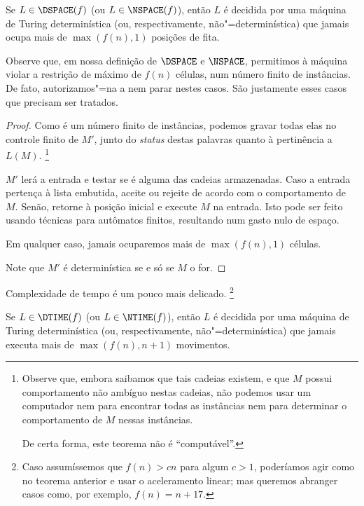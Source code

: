 \begin{theorem}
    Se $L \in \DSPACE(f)$ (ou $L \in \NSPACE(f)$),
    então $L$ é decidida por uma máquina de Turing
    determinística (ou, respectivamente, não"=determinística)
    que jamais ocupa mais de $\max(f(n), 1)$
    posições de fita.
\end{theorem}

Observe que, em nossa definição de $\DSPACE$ e $\NSPACE$,
permitimos à máquina violar a restrição de
máximo de $f(n)$ células,
num número finito de instâncias.
De fato,
autorizamos"=na a nem parar nestes casos.
São justamente esses casos que precisam ser tratados.

\begin{proof}
    Como é um número finito de instâncias,
    podemos gravar todas elas no controle finito de $M'$,
    junto do \emph{status} destas palavras
    quanto à pertinência a $L(M)$.
    \footnote{
        Observe que,
        embora saibamos que tais cadeias existem,
        e que $M$ possui comportamento não ambíguo
        nestas cadeias,
        não podemos usar um computador
        nem para encontrar todas as instâncias
        nem para determinar o comportamento de $M$ nessas instâncias.

        De certa forma,
        este teorema não é ``computável''.
    }

    $M'$ lerá a entrada
    e testar se é alguma das cadeias armazenadas.
    Caso a entrada pertença à lista embutida,
    aceite ou rejeite de acordo com o comportamento de $M$.
    Senão, retorne à posição inicial
    e execute $M$ na entrada.
    Isto pode ser feito usando técnicas
    para autômatos finitos,
    resultando num gasto nulo de espaço.

    Em qualquer caso,
    jamais ocuparemos mais de $\max(f(n), 1)$ células.

    Note que $M'$ é determinística
    se e só se $M$ o for.
\end{proof}

Complexidade de tempo é um pouco mais delicado.
\footnote{
    Caso assumíssemos que $f(n) > cn$
    para algum $c > 1$,
    poderíamos agir como no teorema anterior
    e usar o aceleramento linear;
    mas queremos abranger casos
    como, por exemplo,
    $f(n) = n + 17$.
}

\begin{theorem}
    Se $L \in \DTIME(f)$ (ou $L \in \NTIME(f)$),
    então $L$ é decidida por uma máquina de Turing
    determinística (ou, respectivamente, não"=determinística)
    que jamais executa mais de $\max(f(n), n+1)$ movimentos.
\end{theorem}

